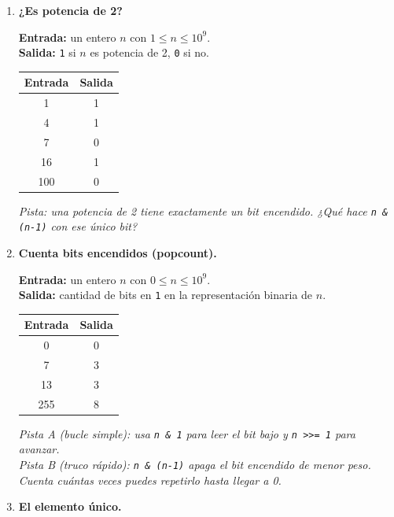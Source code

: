 \documentclass[12pt, oneside]{article}
\begin{document}
\begin{enumerate}[resume]

  \item \textbf{¿Es potencia de 2?}

        \textbf{Entrada:} un entero $n$ con $1 \leq n \leq 10^9$. \\
        \textbf{Salida:} \texttt{1} si $n$ es potencia de 2, \texttt{0} si no.

        \begin{center}
        \begin{tabular}{cc}
          \textbf{Entrada} & \textbf{Salida} \\ \hline
          1  & 1 \\ 4 & 1 \\ 7 & 0 \\ 16 & 1 \\ 100 & 0
        \end{tabular}
        \end{center}

        \textit{Pista: una potencia de 2 tiene exactamente un bit encendido.
        ¿Qué hace \texttt{n \& (n-1)} con ese único bit?}

  \item \textbf{Cuenta bits encendidos (popcount).}

        \textbf{Entrada:} un entero $n$ con $0 \leq n \leq 10^9$. \\
        \textbf{Salida:} cantidad de bits en \texttt{1} en la representación
        binaria de $n$.

        \begin{center}
        \begin{tabular}{cc}
          \textbf{Entrada} & \textbf{Salida} \\ \hline
          0 & 0 \\ 7 & 3 \\ 13 & 3 \\ 255 & 8
        \end{tabular}
        \end{center}

        \textit{Pista A (bucle simple): usa \texttt{n \& 1} para leer el bit bajo
        y \texttt{n >>= 1} para avanzar.} \\
        \textit{Pista B (truco rápido): \texttt{n \& (n-1)} apaga el bit encendido
        de menor peso. Cuenta cuántas veces puedes repetirlo hasta llegar a 0.}

  \item \textbf{El elemento único.}


\end{enumerate}
\end{document}
